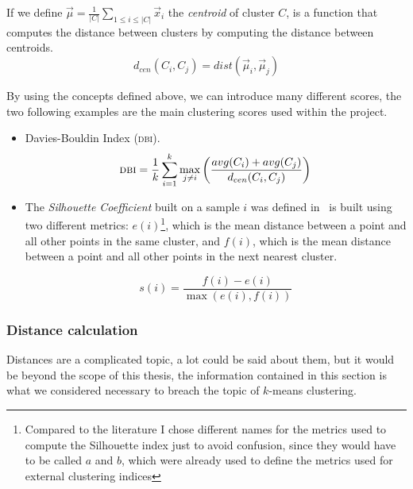 If we define $\vec{\mu} = \frac{1}{|C|} \sum_{1 \leq i \leq |C|} \vec{x}_i$ the \emph{centroid} of
cluster $C$,  is a function that computes the distance between
clusters by computing the distance between centroids.
\begin{equation}
	\label{eq:cluster-centroid-distance}
	d_{cen}(C_i, C_j) = dist(\vec{\mu}_i, \vec{\mu}_j)
\end{equation}

By using the concepts defined above, we can introduce many different scores, the two following
examples are the main clustering scores used within the project.

\begin{itemize}
	\item Davies-Bouldin Index (\textsc{dbi})\cite{bouldin1979}.
		\begin{equation*}
			\textsc{dbi} = \frac{1}{k}\sum_{i = 1}^k\max_{j \neq i}\left(\frac{avg(C_i) + avg(C_j)}{d_{cen}(C_i, C_j)}\right)
		\end{equation*}
	\item The \emph{Silhouette Coefficient} built on a sample $i$ was defined in~\cite{rousseuw1987}
		is built using two different metrics: $e(i)$\footnote{Compared to the literature I
		chose different names for the metrics used to compute the Silhouette index just to
		avoid confusion, since they would have to be called $a$ and $b$, which were already
		used to define the metrics used for external clustering indices}, which is the mean
		distance between a point and all other points in the same cluster, and $f(i)$, which is
		the mean distance between a point and all other points in the next nearest cluster.

		\begin{equation*}
			s(i) = \frac{f(i) - e(i)}{\max(e(i), f(i))}
		\end{equation*}
\end{itemize}

\subsubsection{Distance calculation}
\label{ssec:distance-calculation}
Distances are a complicated topic, a lot could be said about them, but it would be beyond the scope
of this thesis, the information contained in this section is what we considered necessary to breach
the topic of $k$-means clustering.

